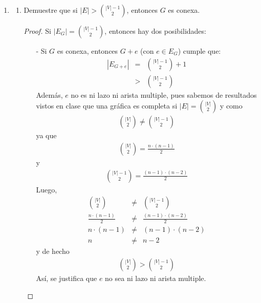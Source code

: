 \documentclass{article}
\begin{document}
\begin{enumerate}
\begin{proof}
      De los casos anteriores, concluimos que una gr\'afica es escindible completa si y s\'olo si
      no contiene a $C_4$ ni a $\overline{P_3}$ como subgr\'afica inducida.
    \end{proof}

  \item \begin{enumerate}

    \item Demuestre que si $|E| > {|V|-1 \choose 2}$, entonces $G$ es conexa.

      \renewcommand\qedsymbol{QED}
      \begin{proof}
        Si $|E_G| = {|V| -1 \choose 2}$, entonces hay dos posibilidades:

        \begin{itemize}
          \item[-] Si $G$ es conexa, entonces $G+e$ (con $e \in E_G$) cumple que:
            \begin{eqnarray*}
              |E_{G +e}| &=& {|V| -1 \choose 2} +1\\
              &>& {|V| -1 \choose 2}
            \end{eqnarray*}
            Además, $e$ no es ni lazo ni arista multiple,
            pues sabemos de resultados vistos en clase que una gráfica es completa si
            $|E| = {|V| \choose 2}$ y como
            \begin{eqnarray*}
              {|V| \choose 2} \not= {|V| -1 \choose 2}
            \end{eqnarray*}
            ya que
            \begin{eqnarray*}
              {|V| \choose 2} = \frac{n \cdot (n -1)}{2}
            \end{eqnarray*}
            y
            \begin{eqnarray*}
              {|V| -1 \choose 2} = \frac{(n -1) \cdot (n -2)}{2}
            \end{eqnarray*}
            Luego,
            \begin{eqnarray*}
              {|V| \choose 2} &\not=& {|V| -1 \choose 2}\\
              \frac{n \cdot (n -1)}{2} &\not=& \frac{(n -1) \cdot (n -2)}{2}\\
              n \cdot (n -1) &\not=& (n -1) \cdot (n -2)\\
              n &\not=& n -2
            \end{eqnarray*}
            y de hecho
            \begin{eqnarray*}
              {|V| \choose 2} > {|V| -1 \choose 2}
            \end{eqnarray*}
            Así, se justifica que $e$ no sea ni lazo ni arista multiple.
            

\end{itemize}
\end{proof}
\end{enumerate}
\end{enumerate}
\end{document}
